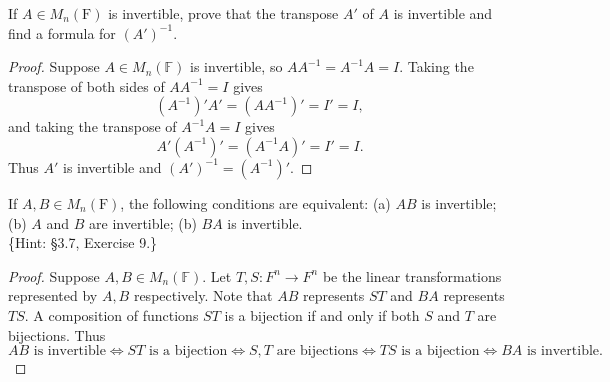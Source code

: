 \begin{tcolorbox}[title=Problem 11, breakable]
If $A \in M_n(\text{F})$ is invertible, prove that the transpose $A'$ of $A$ is invertible and find a formula for $(A')^{-1}$.
\end{tcolorbox}

\begin{proof}
    Suppose $A \in M_n(\mathbb{F})$ is invertible, so $AA^{-1} = A^{-1}A = I$.
    Taking the transpose of both sides of $AA^{-1} = I$ gives
    \[
        (A^{-1})'A' = (AA^{-1})' = I' = I,
    \]
    and taking the transpose of $A^{-1}A = I$ gives
    \[
        A'(A^{-1})' = (A^{-1}A)' = I' = I.
    \]
    Thus $A'$ is invertible and $(A')^{-1} = (A^{-1})'$.
\end{proof}

\begin{tcolorbox}[title=Problem 13, breakable]
If $A, B \in M_n(\text{F})$, the following conditions are equivalent: (a) $AB$ is invertible; (b) $A$ and $B$ are invertible; (b) $BA$ is invertible.\\
\{Hint: \S3.7, Exercise 9.\}
\end{tcolorbox}

\begin{proof}
    Suppose $A, B \in M_n(\mathbb{F})$.
    Let $T, S : F^n \to F^n$ be the linear transformations represented by $A, B$ respectively.
    Note that $AB$ represents $ST$ and $BA$ represents $TS$.
    A composition of functions $ST$ is a bijection if and only if both $S$ and $T$ are bijections.
    Thus
    \[
        AB \text{ is invertible} \iff ST \text{ is a bijection} \iff S, T \text{ are bijections} \iff TS \text{ is a bijection} \iff BA \text{ is invertible.}
    \]
\end{proof}